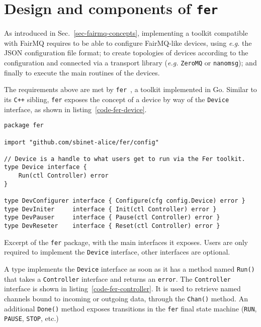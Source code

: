 \documentclass{webofc}
\begin{document}
\section{Design and components of \texttt{fer}}
\label{sec-fer}

As introduced in Sec.~\ref{sec-fairmq-concepts}, implementing a toolkit compatible with FairMQ requires to be able to configure FairMQ-like devices, using \emph{e.g.} the JSON configuration file format; to create topologies of devices according to the configuration and connected via a transport library (\emph{e.g.} \texttt{ZeroMQ} or \texttt{nanomsg}); and finally to execute the main routines of the devices.

The requirements above are met by \texttt{fer}~\cite{ref-fer}, a toolkit implemented in Go.
Similar to its \texttt{C++} sibling, \texttt{fer} exposes the concept of a device by way of the \texttt{Device} interface, as shown in listing~\ref{code-fer-device}.

\begin{listing}[h]
\centering
\begin{verbatim}
package fer

import "github.com/sbinet-alice/fer/config"

// Device is a handle to what users get to run via the Fer toolkit.
type Device interface {
	Run(ctl Controller) error
}

type DevConfigurer interface { Configure(cfg config.Device) error }
type DevIniter     interface { Init(ctl Controller) error }
type DevPauser     interface { Pause(ctl Controller) error }
type DevReseter    interface { Reset(ctl Controller) error }
\end{verbatim}
	\caption{Excerpt of the \texttt{fer} package, with the main interfaces it exposes. Users are only required to implement the \texttt{Device} interface, other interfaces are optional.}
\label{code-fer-device}
\end{listing}

A type implements the \texttt{Device} interface as soon as it has a method named \texttt{Run()} that takes a \texttt{Controller} interface and returns an \texttt{error}.
The \texttt{Controller} interface is shown in listing~\ref{code-fer-controller}.
It is used to retrieve named channels bound to incoming or outgoing data, through the \texttt{Chan()} method.
An additional \texttt{Done()} method exposes transitions in the \texttt{fer} final state machine (\texttt{RUN}, \texttt{PAUSE}, \texttt{STOP}, etc.)
\end{document}

